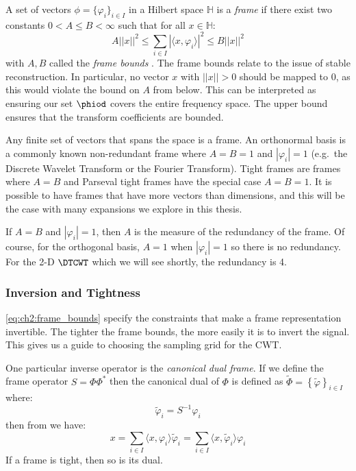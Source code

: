A set of vectors $ \phi = \{ \varphi_i \}_{i \in I}$ in a Hilbert space
$\mathbb{H}$ is a \emph{frame} if there exist two constants $0 < A\leq B <
\infty$ such that for all $x \in \mathbb{H}$:
\begin{equation}
  A||x||^2 \leq \sum_{i\in I} |\langle x, \varphi_i \rangle|^2 \leq B ||x||^2
  \label{eq:ch2:frame_bounds}
\end{equation}
with $A, B$ called the \emph{frame bounds} \cite{kovacevic_introduction_2008}.
The frame bounds relate to the issue of stable reconstruction. In particular, no
vector $x$ with $||x||>0$ should be mapped to 0, as this would violate the bound
on $A$ from below. This can be interpreted as ensuring our set $\phiod$ covers the
entire frequency space. The upper bound ensures that the transform
coefficients are bounded.

Any finite set of vectors that spans the space is a frame. An orthonormal basis
is a commonly known non-redundant frame where $A=B=1$ and $|\varphi_i|=1$ (e.g.\ the Discrete
Wavelet Transform or the Fourier Transform). Tight frames are frames where $A=B$
and Parseval tight frames have the special case $A=B=1$. It is possible to have
frames that have more vectors than dimensions, and this will be the case with
many expansions we explore in this thesis.

If $A=B$ and $|\varphi_i| = 1$, then $A$ is
the measure of the redundancy of the frame. Of course, for the orthogonal basis,
$A=1$ when $|\varphi_i|=1$ so there is no redundancy. For the 2-D $\DTCWT$ which we
will see shortly, the redundancy is 4.

\subsubsection{Inversion and Tightness}
\eqref{eq:ch2:frame_bounds} specify the constraints that make a frame
representation invertible.
The tighter the frame bounds, the more easily it is to invert the signal.
This gives us a guide to choosing the sampling grid for the CWT.

One particular inverse operator is the \emph{canonical dual frame}.
If we define the frame operator $S = \Phi\Phi^*$ then the canonical dual
of $\Phi$ is defined as $\tilde{\Phi} = \left\{ \tilde{\varphi}\right\}_{i \in I}$
where:
\begin{equation}
  \tilde{\varphi}_i = S^{-1}\varphi_i
\end{equation}
then from \cite{kovacevic_introduction_2008} we have:
\begin{equation}
  x = \sum_{i\in I} \langle x, \varphi_i \rangle \tilde{\varphi}_i = \sum_{i\in I}
  \langle x, \tilde{\varphi}_i \rangle \varphi_i
\end{equation}
If a frame is tight, then so is its dual.

